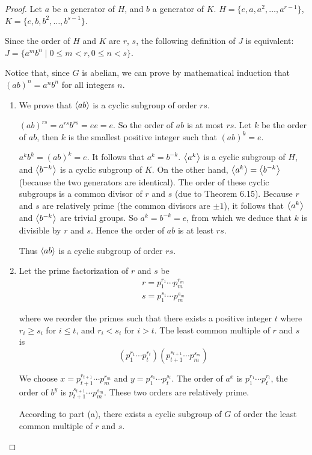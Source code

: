 \begin{proof}
    Let $a$ be a generator of $H$, and $b$ a generator of $K$. $H = \{ e, a, a^{2}, \ldots, a^{r-1} \}$, $K = \{ e, b, b^{2}, \ldots, b^{s-1} \}$.

    Since the order of $H$ and $K$ are $r$, $s$, the following definition of $J$ is equivalent: $J = \{ a^{m}b^{n} \mid 0\leq m < r, 0\leq n < s \}$.

    Notice that, since $G$ is abelian, we can prove by mathematical induction that ${(ab)}^{n} = a^{n}b^{n}$ for all integers $n$.

    \begin{enumerate}[label={\textbf{\alph*.}}]
        \item We prove that $\left\langle{ab}\right\rangle$ is a cyclic subgroup of order $rs$.

              ${(ab)}^{rs} = a^{rs}b^{rs} = ee = e$. So the order of $ab$ is at most $rs$. Let $k$ be the order of $ab$, then $k$ is the smallest positive integer such that ${(ab)}^{k} = e$.

              $a^{k}b^{k} = {(ab)}^{k} = e$. It follows that $a^{k} = b^{-k}$. $\left\langle{a^{k}}\right\rangle$ is a cyclic subgroup of $H$, and $\left\langle{b^{-k}}\right\rangle$ is a cyclic subgroup of $K$. On the other hand, $\left\langle{a^{k}}\right\rangle = \left\langle{b^{-k}}\right\rangle$ (because the two generators are identical). The order of these cyclic subgroups is a common divisor of $r$ and $s$ (due to Theorem 6.15). Because $r$ and $s$ are relatively prime (the common divisors are $\pm 1$), it follows that $\left\langle{a^{k}}\right\rangle$ and $\left\langle{b^{-k}}\right\rangle$ are trivial groups. So $a^{k} = b^{-k} = e$, from which we deduce that $k$ is divisible by $r$ and $s$. Hence the order of $ab$ is at least $rs$.

              Thus $\left\langle{ab}\right\rangle$ is a cyclic subgroup of order $rs$.
        \item Let the prime factorization of $r$ and $s$ be
              \[
                  \begin{split}
                      r = {p}_{1}^{r_{1}}\cdots {p}_{m}^{r_{m}} \\
                      s = {p}_{1}^{s_{1}}\cdots {p}_{m}^{s_{m}}
                  \end{split}
              \]

              where we reorder the primes such that there exists a positive integer $t$ where $r_{i}\geq s_{i}$ for $i \leq t$, and $r_{i} < s_{i}$ for $i > t$. The least common multiple of $r$ and $s$ is
              \[
                  ({p}_{1}^{r_{1}}\cdots {p}_{t}^{r_{t}})({p}_{t+1}^{s_{t+1}}\cdots {p}_{m}^{s_{m}})
              \]

              We choose $x = {p}_{t+1}^{r_{t+1}}\cdots {p}_{m}^{r_{m}}$ and $y = {p}_{1}^{s_{1}}\cdots {p}_{t}^{s_{t}}$. The order of $a^{x}$ is ${p}_{1}^{r_{1}}\cdots {p}_{t}^{r_{t}}$, the order of $b^{y}$ is ${p}_{t+1}^{s_{t+1}}\cdots {p}_{m}^{s_{m}}$. These two orders are relatively prime.

              According to part (a), there exists a cyclic subgroup of $G$ of order the least common multiple of $r$ and $s$.
    \end{enumerate}
\end{proof}

